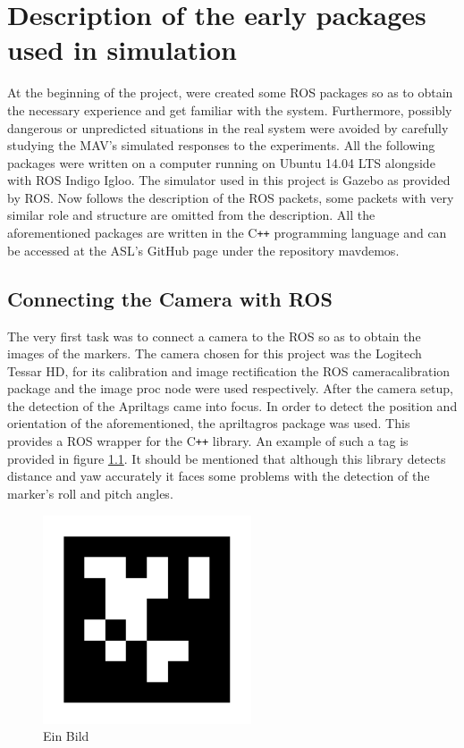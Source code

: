 \chapter{Description of the early packages used in simulation}
\label{sec:earlyPackages}

At the beginning of the project, were created some ROS packages so as to obtain the necessary experience and get familiar with the system. Furthermore, possibly dangerous or unpredicted situations in the real system were avoided by carefully studying the MAV's simulated responses to the experiments. All the following packages were written on a computer running on Ubuntu 14.04 LTS alongside with ROS Indigo Igloo. The simulator used in this project is Gazebo\cite{GazeboSimulator} as provided by ROS. Now follows the description of the ROS packets, some packets with very similar role and structure are omitted from the description. All the aforementioned packages are written in the C\texttt{++} programming language\cite{Stroustrup} and can be accessed at the ASL's GitHub page under the repository mav\textunderscore demos\cite{MyRepoGitHub}. 


\section{Connecting the Camera with ROS}
\label{sec:connectedCamera}
The very first task was to connect a camera to the ROS so as to obtain the images of the markers. The camera chosen for this project was the Logitech Tessar HD, for its calibration and image rectification the ROS camera\textunderscore calibration package and the image \textunderscore proc node were used respectively. After the camera setup, the detection of the Apriltags\cite{olson2011tags} came into focus. In order to detect the position and orientation of the aforementioned, the apriltag\textunderscore ros package was used. This provides a ROS wrapper for the C\texttt{++} library\cite{ROSApriltag}. An example of such a tag is provided in figure \ref{pics:tag36h11}. It should be mentioned that although this library detects distance and yaw accurately it faces some problems with the detection of the marker's roll and pitch angles.

\begin{figure}
   \centering
   \includegraphics[width=0.55\textwidth]{images/tag36h11_im_large.pdf}
   \caption{Ein Bild}
   \label{pics:tag36h11}
\end{figure}


